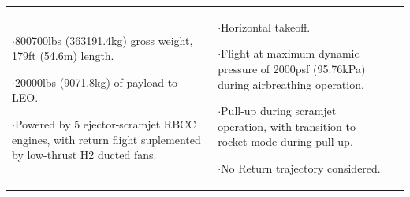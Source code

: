 \begin{xltabular}{\linewidth}{|X|X|X|}
$\cdot$800700lbs (363191.4kg) gross weight, 179ft (54.6m) length. 

$\cdot$20000lbs (9071.8kg) of payload to LEO. 

$\cdot$Powered by 5 ejector-scramjet RBCC engines, with return flight suplemented by low-thrust H2 ducted fans. 

&\small {} 

$\cdot$Horizontal takeoff.

$\cdot$Flight at maximum dynamic pressure of 2000psf (95.76kPa) during airbreathing operation. 

$\cdot$Pull-up during scramjet operation, with transition to rocket mode during pull-up. 

$\cdot$No Return trajectory considered.


\end{xltabular}
